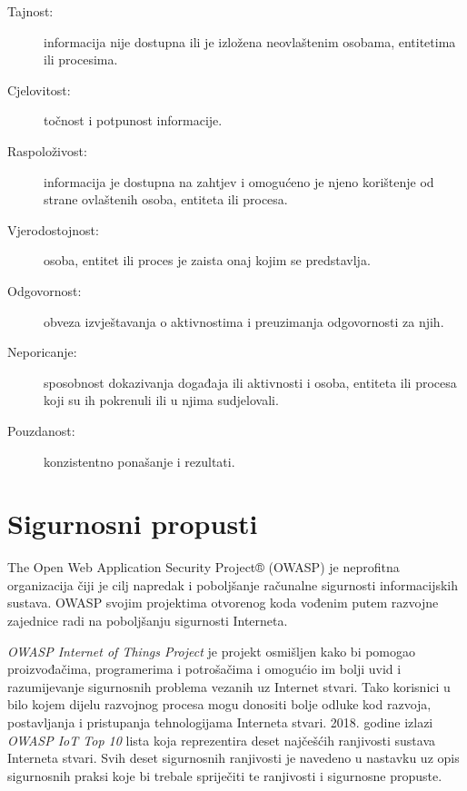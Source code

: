\documentclass[times, utf8, diplomski]{fer}
\begin{document}
\begin{description}
    \item[Tajnost:]informacija nije dostupna ili je izložena  neovlaštenim osobama, entitetima ili procesima.
    \item[Cjelovitost:]točnost i potpunost informacije.
    \item[Raspoloživost:]informacija je dostupna na zahtjev i omogućeno je njeno korištenje od strane ovlaštenih osoba, entiteta ili procesa.
    \item[Vjerodostojnost:]osoba, entitet ili proces je zaista onaj kojim se predstavlja.
    \item[Odgovornost:]obveza izvještavanja o aktivnostima i preuzimanja odgovornosti za njih.
    \item[Neporicanje:]sposobnost dokazivanja događaja ili aktivnosti i osoba, entiteta ili procesa koji su ih pokrenuli ili u njima sudjelovali.
    \item[Pouzdanost:]konzistentno ponašanje i rezultati.
\end{description}

\section{Sigurnosni propusti}
The Open Web Application Security Project® (OWASP) je neprofitna organizacija čiji je cilj napredak i poboljšanje računalne sigurnosti informacijskih sustava. OWASP svojim projektima otvorenog koda vođenim putem razvojne zajednice radi na poboljšanju sigurnosti Interneta.

\emph{OWASP Internet of Things Project} je projekt osmišljen kako bi pomogao proizvođačima, programerima i potrošačima i omogućio im bolji uvid i razumijevanje sigurnosnih problema vezanih uz Internet stvari. Tako korisnici u bilo kojem dijelu razvojnog procesa mogu donositi bolje odluke kod razvoja, postavljanja i pristupanja tehnologijama Interneta stvari\citep{owasp1}. 2018. godine izlazi \emph{OWASP IoT Top 10} lista koja reprezentira deset najčešćih ranjivosti sustava Interneta stvari. Svih deset sigurnosnih ranjivosti je navedeno u nastavku uz opis sigurnosnih praksi koje bi trebale spriječiti te ranjivosti i sigurnosne propuste. 
\end{document}
